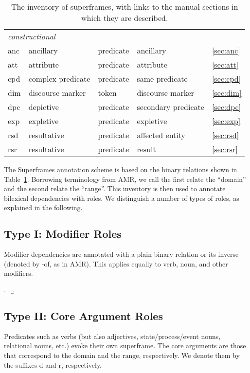 \documentclass[a4paper]{article}
\begin{document}
\begin{table}
\begin{tabular}{lllll}
        \midrule
        \multicolumn{4}{l}{\emph{constructional}} \\
        anc & ancillary & predicate & ancillary & \ref{sec:anc} \\
        att & attribute & predicate & attribute & \ref{sec:att} \\
        cpd & complex predicate & predicate & same predicate & \ref{sec:cpd} \\
        dim & discourse marker & token & discourse marker & \ref{sec:dim} \\
        dpc & depictive & predicate & secondary predicate & \ref{sec:dpc}\\
        exp & expletive & predicate & expletive & \ref{sec:exp} \\
        rsd & resultative & predicate & affected entity & \ref{sec:rsd} \\
        rsr & resultative & predicate & result & \ref{sec:rsr} \\
        \bottomrule
    \end{tabular}
    \caption{The inventory of superframes, with links to the manual sections in which they are described.}
    \label{tab:inventory}
\end{table}

The Superframes annotation scheme is based on the binary relations shown in Table~\ref{tab:inventory}. Borrowing terminology from AMR, we call the first relate the ``domain'' and the second relate the ``range''. This inventory is then used to annotate bilexical dependencies with roles. We distinguish a number of types of roles, as explained in the following.

\subsection{Type I: Modifier Roles}

Modifier dependencies are annotated with a plain binary relation or its inverse (denoted by \textsf{-of}, as in AMR). This applies equally to verb, noun, and other modifiers.

\ex. \a. 
     \b. 

\subsection{Type II: Core Argument Roles}

Predicates such as verbs (but also adjectives, state/process/event nouns, relational nouns, etc.) evoke their own superframe. The core arguments are those that correspond to the domain and the range, respectively. We denote them by the suffixes \textsf{d} and \textsf{r}, respectively.
\end{document}
